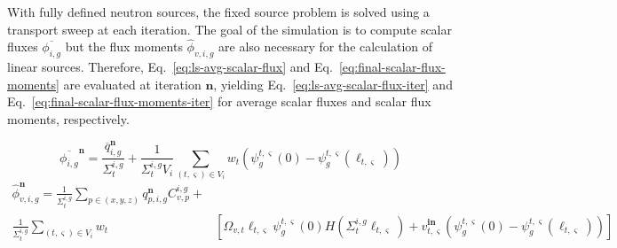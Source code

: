 With fully defined neutron sources, the fixed source problem is solved using a transport sweep at each iteration. The goal of the simulation is to compute scalar fluxes $\overline{\phi_{i,g}}$ but the flux moments $\hat{\phi}_{v,i,g}$ are also necessary for the calculation of linear sources. Therefore, Eq.~\ref{eq:ls-avg-scalar-flux} and Eq.~\ref{eq:final-scalar-flux-moments} are evaluated at iteration $\mathbf{n}$, yielding Eq.~\ref{eq:ls-avg-scalar-flux-iter} and Eq.~\ref{eq:final-scalar-flux-moments-iter} for average scalar fluxes and scalar flux moments, respectively. 

\begin{equation}
\overline{\phi_{i,g}}^{\mathbf{n}} = \frac{\overline{q}_{i,g}^{\mathbf{n}}}{\Sigma_{t}^{i,g}} + \frac{1}{\Sigma_{t}^{i,g} V_i} \sum_{(t,\varsigma) \in V_i} w_t \left(\psi^{t,\varsigma}_g(0) - \psi^{t,\varsigma}_g(\ell_{t,\varsigma}) \right)
\label{eq:ls-avg-scalar-flux-iter}
\end{equation}
\begin{equation}
\begin{split}
\hat{\phi}_{v,i,g}^{\mathbf{n}} = \frac{1}{\Sigma_{t}^{i,g}} \sum_{p \in (x,y,z)} q_{p,i,g}^{\mathbf{n}} C_{v,p}^{i,g} + & \\
\frac{1}{\Sigma_{t}^{i,g}} \sum_{(t,\varsigma) \in V_i} w_t & \left[\Omega_{v,t} \ell_{t,\varsigma} \psi^{t,\varsigma}_g(0) H(\Sigma_{t}^{i,g} \ell_{t,\varsigma}) + v^{\textbf{in}}_{t,\varsigma} \left(\psi^{t,\varsigma}_g(0) - \psi^{t,\varsigma}_g(\ell_{t,\varsigma}) \right)\right]
\end{split}
\label{eq:final-scalar-flux-moments-iter}
\end{equation}

